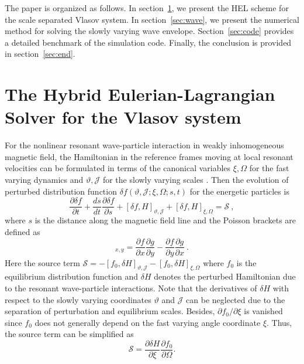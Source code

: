 \documentclass[times,12pt,3p,longtitle]{elsarticle}
\begin{document}
The paper is  organized  as follows. 
 In section~\ref{sec:vlasov}, we present 
 the HEL scheme for the scale separated Vlasov system.
 In section~\ref{sec:wave}, we present  the numerical method for solving the slowly varying  wave envelope. Section~\ref{sec:code} provides a detailed benchmark of the simulation code. Finally, the conclusion is provided in section~\ref{sec:end}.

%
\section{The Hybrid Eulerian-Lagrangian Solver for the Vlasov system}
\label{sec:vlasov}
For the nonlinear resonant wave-particle interaction in weakly inhomogeneous magnetic field,
the  Hamiltonian 
 in the reference frames moving at local resonant velocities 
can be formulated in terms of   
the canonical variables $\xi,\Omega$ for the fast   varying
dynamics 
and $\vartheta,\mathcal{J}$ 
for the slowly varying scales
 \cite{zheng2023a}.
 Then the evolution of  perturbed distribution function $\delta f(\vartheta,\mathcal{J};\xi,\Omega;s,t)$ for the energetic particles is
\begin{equation}\label{eq.deltaf}
    \frac{\partial \delta f}{\partial t}+ \frac{d s}{d t} \frac{\partial \delta f}{\partial s} + \left[\delta f, H\right]_{\vartheta,\mathcal{J}} +  \left[\delta f, H\right]_{\xi,\Omega} = \mathcal{S}~,
\end{equation}
where $s$ is the distance along the magnetic field line and  the   Poisson brackets are defined as
\begin{equation}
    [f,~g]_{x,y} = \frac{\partial f}{\partial x}\frac{\partial g}{\partial y}-\frac{\partial f}{\partial y}\frac{\partial g}{\partial x}~.
\end{equation}
Here 
the source term $\mathcal{S}= -\left[f_0, \delta H\right]_{\vartheta, \mathcal{J}} - \left[f_0, \delta H\right]_{\xi, \Omega}$ 
where $f_0$ is the equilibrium distribution function and $\delta H$ denotes the perturbed Hamiltonian due to the resonant wave-particle interactions.
Note that the derivatives of $\delta H$ with respect to the slowly varying coordinates $\vartheta$ and $\mathcal{J}$ can be neglected due to the separation of perturbation and equilibrium scales. Besides, $\partial f_0/\partial \xi$ is vanished since $f_0$ does not generally depend on the fast varying angle coordinate $\xi$.
Thus, the source term can be simplified as 
\begin{equation}
     \mathcal{S} = \frac{\partial \delta H}{\partial \xi}\frac{\partial f_0}{\partial \Omega}.
\end{equation}
\end{document}
